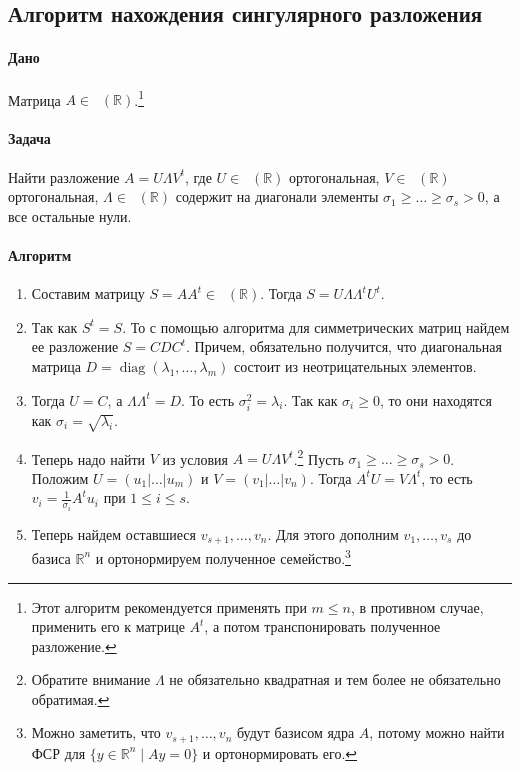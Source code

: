 \documentclass{article}
\newcommand{\MatrixDim}[3]{\mathop{\mathrm{M}_{#2\,#3}}(#1)}
\newcommand{\Matrix}[2]{\mathop{\mathrm{M}_{#2}}(#1)}
\newcommand{\diag}{\operatorname{diag}}
\begin{document}
\subsection{Алгоритм нахождения сингулярного разложения}

\paragraph{Дано} Матрица $A \in \MatrixDim{\mathbb R}{m}{n}$.\footnote{Этот алгоритм рекомендуется применять при $m\leqslant n$, в противном случае, применить его к матрице $A^t$, а потом транспонировать полученное разложение.}

\paragraph{Задача} Найти разложение $A = U \Lambda V^t$, где $U\in\Matrix{\mathbb R}{m}$ ортогональная, $V\in\Matrix{\mathbb R}{n}$ ортогональная, $\Lambda \in\MatrixDim{\mathbb R}{m}{n}$ содержит на диагонали элементы $\sigma_1\geqslant\ldots\geqslant \sigma_s>0$, а все остальные нули.

\paragraph{Алгоритм}
\begin{enumerate}
\item Составим матрицу $S = A A^t\in\Matrix{\mathbb R}{m}$. Тогда $S = U \Lambda\Lambda^t U^t$. 

\item Так как $S^t = S$. То с помощью алгоритма для симметрических матриц найдем ее разложение $S = C D C^t$. Причем, обязательно получится, что диагональная матрица $D=\diag(\lambda_1,\ldots,\lambda_m)$ состоит из неотрицательных элементов.

\item Тогда $U = C$, а $\Lambda\Lambda^t = D$. То есть $\sigma_i^2 = \lambda_i$. Так как $\sigma_i \geqslant 0$, то они находятся как $\sigma_i = \sqrt{ \lambda_i}$.

\item Теперь надо найти $V$ из условия $A = U\Lambda V^t$.\footnote{Обратите внимание $\Lambda$ не обязательно квадратная и тем более не обязательно обратимая.} Пусть $\sigma_1\geqslant \ldots \geqslant \sigma_s > 0$. Положим $U=(u_1|\ldots|u_m)$ и $V = (v_1|\ldots|v_n)$. Тогда $A^t U = V\Lambda^t $, то есть $v_i = \frac{1}{\sigma_i}A^t u_i$ при $1\leqslant i\leqslant s$.

\item Теперь найдем оставшиеся $v_{s+1},\ldots,v_n$. Для этого дополним $v_1,\ldots,v_s$ до базиса $\mathbb R^{n}$ и ортонормируем полученное семейство.\footnote{Можно заметить, что $v_{s+1},\ldots,v_n$ будут базисом ядра $A$, потому можно найти ФСР для $\{y\in\mathbb R^{n}\mid Ay = 0\}$ и ортонормировать его.}

\end{enumerate}
\end{document}
